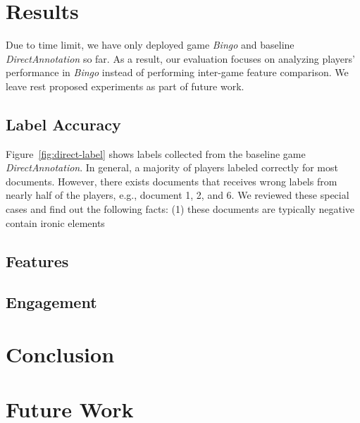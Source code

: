 \documentclass[chi_draft]{sigchi}
\begin{document}
\section{Results}

Due to time limit, we have only deployed game \emph{Bingo} and baseline \emph{DirectAnnotation} so far. As a result, our evaluation focuses on analyzing players' performance in \emph{Bingo} instead of performing inter-game feature comparison. We leave rest proposed experiments as part of future work.

\subsection{Label Accuracy}

Figure~\ref{fig:direct-label} shows labels collected from the baseline game \emph{DirectAnnotation}. In general, a majority of players labeled correctly for most documents. However, there exists documents that receives wrong labels from nearly half of the players, e.g., document 1, 2, and 6. We reviewed these special cases and find out the following facts: (1) these documents are typically negative contain ironic elements

\subsection{Features}

\subsection{Engagement}

\section{Conclusion}

\section{Future Work}


%
%
%
%
%



\end{document}
